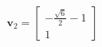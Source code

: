 \documentclass[preview]{standalone}
\begin{document}
\begin{align*}
\mathbf{v}_2 = \left[\begin{matrix}- \frac{\sqrt{6}}{2} - 1\\1\end{matrix}\right]
\end{align*}
\end{document}
